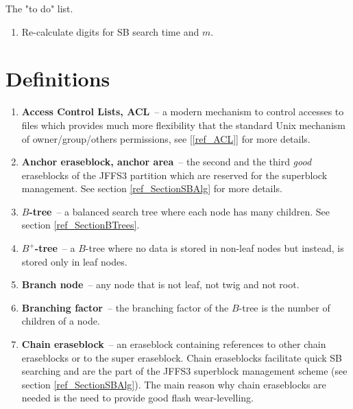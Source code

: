 \documentclass[12pt,a4paper,oneside,titlepage]{article}
\begin{document}
The "to do" list.

\begin{enumerate}

\item Re-calculate digits for SB search time and $m$.

\end{enumerate}

%
%
\section{Definitions}\label{ref_SectDefinitions}

\begin{enumerate}

\item \textbf{Access Control Lists, ACL}~-- a modern mechanism to control
accesses to files which provides much more flexibility that the standard Unix
mechanism of owner/group/others permissions, see [\ref{ref_ACL}] for more
details.

\item \textbf{Anchor eraseblock, anchor area}~-- the second and the third
\emph{good} eraseblocks of the JFFS3 partition which are reserved for the
superblock management. See section \ref{ref_SectionSBAlg} for more details.

\item \textbf{$B$-tree}~-- a balanced search tree where each node has many
children. See section \ref{ref_SectionBTrees}.

\item \textbf{$B^+$-tree}~-- a \mbox{$B$-tree} where no data is stored in
\mbox{non-leaf} nodes but instead, is stored only in leaf nodes.

\item \textbf{Branch node}~-- any node that is not leaf, not twig and not root.

\item \textbf{Branching factor}~-- the branching factor of the $B$-tree is the
number of children of a node.

\item \textbf{Chain eraseblock}~-- an eraseblock containing references to other
chain eraseblocks or to the super eraseblock. Chain eraseblocks facilitate
quick SB searching and are the part of the JFFS3 superblock management scheme
(see section \ref{ref_SectionSBAlg}). The main reason why chain eraseblocks are
needed is the need to provide good flash \mbox{wear-levelling}.


\end{enumerate}
\end{document}
